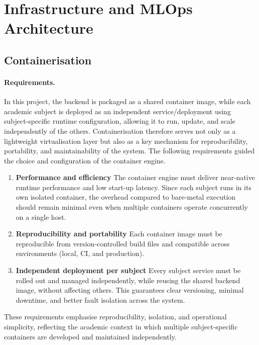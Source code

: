 \section{Infrastructure and MLOps Architecture}

\subsection{Containerisation}

\paragraph{Requirements.}
In this project, the backend is packaged as a shared container image, while each academic subject is deployed as an independent service/deployment using subject-specific runtime configuration, allowing it to run, update, and scale independently of the others. Containerisation therefore serves not only as a lightweight virtualisation layer but also as a key mechanism for reproducibility, portability, and maintainability of the system. The following requirements guided the choice and configuration of the container engine.

\begin{enumerate}
    \item \textbf{Performance and efficiency}  
    The container engine must deliver near-native runtime performance and low start-up latency. Since each subject runs in its own isolated container, the overhead compared to bare-metal execution should remain minimal even when multiple containers operate concurrently on a single host.

    \item \textbf{Reproducibility and portability}  
    Each container image must be reproducible from version-controlled build files and compatible across environments (local, CI, and production).

    \item \textbf{Independent deployment per subject}  
    Every subject service must be rolled out and managed independently, while reusing the shared backend image, without affecting others. This guarantees clear versioning, minimal downtime, and better fault isolation across the system.

\end{enumerate}

These requirements emphasise reproducibility, isolation, and operational simplicity, reflecting the academic context in which multiple subject-specific containers are developed and maintained independently.

